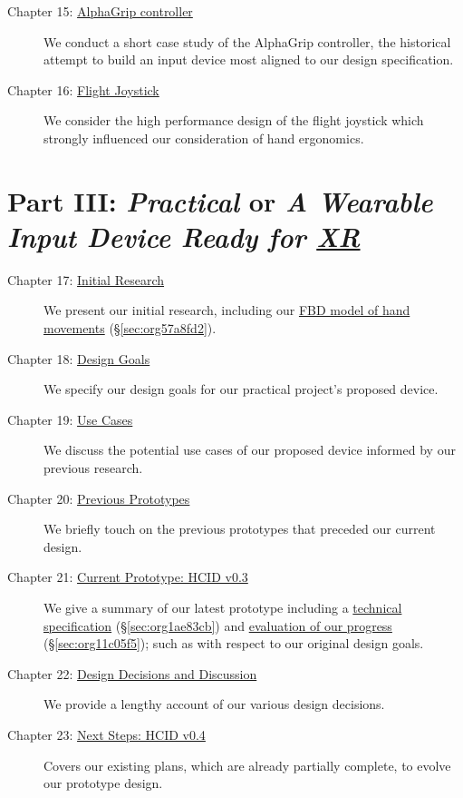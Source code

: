 \documentclass[logo,bsc,singlespacing,parskip]{infthesis}
\begin{document}
\begin{description}
\item[{Chapter 15: \hyperref[sec:org1b6f9a0]{AlphaGrip controller}}] We  conduct a short case study of the AlphaGrip controller, the historical attempt to build  an input device most aligned to our design specification.

\item[{Chapter 16: \hyperref[sec:org69f16d7]{Flight Joystick}}] We consider the high performance design of the flight joystick which strongly influenced our consideration of hand ergonomics.
\end{description}

\section*{Part III: \emph{Practical} or \emph{A Wearable Input Device Ready for \hyperref[org39cbd51]{XR}}}
\label{sec:orgbe32ec4}
\begin{description}
\item[{Chapter 17: \hyperref[sec:orge0c8edf]{Initial Research}}] We present our initial research, including our \hyperref[sec:org57a8fd2]{FBD model of hand movements} (\S \ref{sec:org57a8fd2}).

\item[{Chapter 18: \hyperref[sec:orgf250acb]{Design Goals}}] We specify our design goals for our practical project's proposed device.

\item[{Chapter 19:  \hyperref[sec:org2d37584]{Use Cases}}] We discuss the potential use cases of our proposed  device  informed by our previous research.

\item[{Chapter 20: \hyperref[sec:org07d55de]{Previous Prototypes}}] We briefly touch on the previous prototypes that preceded our current design.

\item[{Chapter 21: \hyperref[sec:org25f7bc2]{Current Prototype: HCID v0.3}}] We give a summary of our latest prototype including a \hyperref[sec:org1ae83cb]{technical specification} (\S \ref{sec:org1ae83cb}) and \hyperref[sec:org11c05f5]{evaluation of our progress} (\S \ref{sec:org11c05f5}); such as with respect to our original design goals.

\item[{Chapter 22: \hyperref[sec:org70f081f]{Design Decisions and Discussion}}] We provide a lengthy account of our various design decisions.

\item[{Chapter 23:  \hyperref[sec:orgf0596d4]{Next Steps: HCID v0.4}}] Covers our existing plans, which are already partially complete, to evolve our prototype design.
\end{description}
\end{document}
